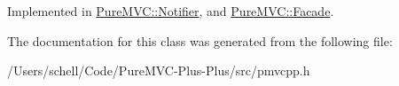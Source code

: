 Implemented in \hyperlink{class_pure_m_v_c_1_1_notifier_a55a358ee2661ecc08400653016fdb497}{PureMVC::Notifier}, and \hyperlink{class_pure_m_v_c_1_1_facade_a39a61e0a65d0f979848d36fe99cfd5f5}{PureMVC::Facade}.

The documentation for this class was generated from the following file:\begin{DoxyCompactItemize}
\item 
/Users/schell/Code/PureMVC-\/Plus-\/Plus/src/pmvcpp.h\end{DoxyCompactItemize}
